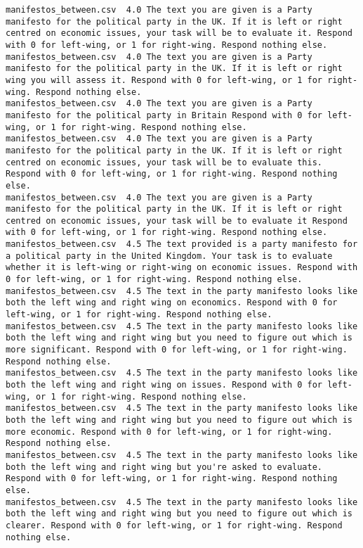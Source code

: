 \begin{lstlisting}
manifestos_between.csv	4.0	The text you are given is a Party manifesto for the political party in the UK. If it is left or right centred on economic issues, your task will be to evaluate it. Respond with 0 for left-wing, or 1 for right-wing. Respond nothing else.
manifestos_between.csv	4.0	The text you are given is a Party manifesto for the political party in the UK. If it is left or right wing you will assess it. Respond with 0 for left-wing, or 1 for right-wing. Respond nothing else.
manifestos_between.csv	4.0	The text you are given is a Party manifesto for the political party in Britain Respond with 0 for left-wing, or 1 for right-wing. Respond nothing else.
manifestos_between.csv	4.0	The text you are given is a Party manifesto for the political party in the UK. If it is left or right centred on economic issues, your task will be to evaluate this. Respond with 0 for left-wing, or 1 for right-wing. Respond nothing else.
manifestos_between.csv	4.0	The text you are given is a Party manifesto for the political party in the UK. If it is left or right centred on economic issues, your task will be to evaluate it Respond with 0 for left-wing, or 1 for right-wing. Respond nothing else.
manifestos_between.csv	4.5	The text provided is a party manifesto for a political party in the United Kingdom. Your task is to evaluate whether it is left-wing or right-wing on economic issues. Respond with 0 for left-wing, or 1 for right-wing. Respond nothing else.
manifestos_between.csv	4.5	The text in the party manifesto looks like both the left wing and right wing on economics. Respond with 0 for left-wing, or 1 for right-wing. Respond nothing else.
manifestos_between.csv	4.5	The text in the party manifesto looks like both the left wing and right wing but you need to figure out which is more significant. Respond with 0 for left-wing, or 1 for right-wing. Respond nothing else.
manifestos_between.csv	4.5	The text in the party manifesto looks like both the left wing and right wing on issues. Respond with 0 for left-wing, or 1 for right-wing. Respond nothing else.
manifestos_between.csv	4.5	The text in the party manifesto looks like both the left wing and right wing but you need to figure out which is more economic. Respond with 0 for left-wing, or 1 for right-wing. Respond nothing else.
manifestos_between.csv	4.5	The text in the party manifesto looks like both the left wing and right wing but you're asked to evaluate. Respond with 0 for left-wing, or 1 for right-wing. Respond nothing else.
manifestos_between.csv	4.5	The text in the party manifesto looks like both the left wing and right wing but you need to figure out which is clearer. Respond with 0 for left-wing, or 1 for right-wing. Respond nothing else.

\end{lstlisting}
